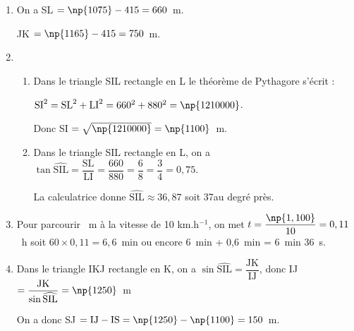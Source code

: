 \begin{enumerate}
\item %
On a SL $ = \np{1075} - 415 = 660$~m.

JK $ = \np{1165} - 415 = 750$~m. 
\item  
	\begin{enumerate}
		\item %
Dans le triangle SIL rectangle en L le théorème de Pythagore s'écrit :
		
$\text{SI}^2 = \text{SL}^2 + \text{LI}^2  = 660^2 + 880^2 = \np{1210000}$.

Donc SI $ = \sqrt{\np{1210000}} = \np{1100}$~m.
		\item %
Dans le triangle SIL rectangle en L, on a $\tan \widehat{\text{SIL}} = \dfrac{\text{SL}}{\text{LI}} = \dfrac{660}{880} = \dfrac{6}{8} = \dfrac{3}{4} = 0,75$.

La calculatrice donne $\widehat{\text{SIL}} \approx 36,87$ soit 37\degres au degré près.
 	\end{enumerate} 
\item %

Pour parcourir ~m à la vitesse de 10 km.h$^{-1}$, on met $t = \dfrac{\np{1,100}}{10} = 0,11$~h soit $60 \times 0,11 = 6,6$~min ou encore 6~min + 0,6~min = 6~min 36~s.
\item %

Dans le triangle IKJ rectangle en K, on a $\sin \widehat{\text{SIL}} = \dfrac{\text{JK}}{\text{IJ}}$, donc IJ $ = \dfrac{\text{JK}}{\sin \widehat{\text{SIL}}} = \np{1250}$~m

On a donc SJ $ = \text{IJ} - \text{IS} = \np{1250} - \np{1100} = 150$~m. 
\end{enumerate}


